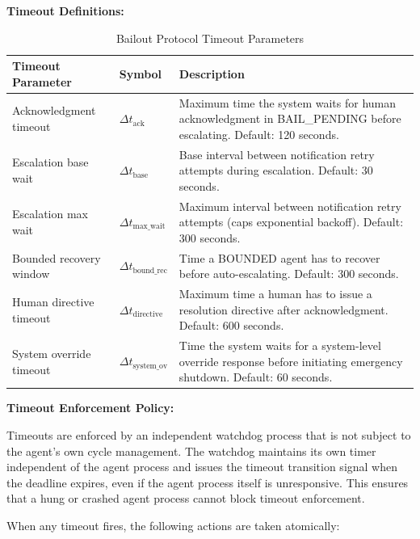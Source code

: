 \medskip\noindent\textbf{Timeout Definitions:}

\begin{table}[H]
\centering
\begin{tabular}{llp{6cm}}
\toprule
\textbf{Timeout Parameter} & \textbf{Symbol} & \textbf{Description} \\
\midrule
Acknowledgment timeout & $\Delta t_{\text{ack}}$ & Maximum time the system waits for human acknowledgment in BAIL\_PENDING before escalating. Default: 120 seconds. \\
Escalation base wait & $\Delta t_{\text{base}}$ & Base interval between notification retry attempts during escalation. Default: 30 seconds. \\
Escalation max wait & $\Delta t_{\text{max\_wait}}$ & Maximum interval between notification retry attempts (caps exponential backoff). Default: 300 seconds. \\
Bounded recovery window & $\Delta t_{\text{bound\_rec}}$ & Time a BOUNDED agent has to recover before auto-escalating. Default: 300 seconds. \\
Human directive timeout & $\Delta t_{\text{directive}}$ & Maximum time a human has to issue a resolution directive after acknowledgment. Default: 600 seconds. \\
System override timeout & $\Delta t_{\text{system\_ov}}$ & Time the system waits for a system-level override response before initiating emergency shutdown. Default: 60 seconds. \\
\bottomrule
\end{tabular}
\caption{Bailout Protocol Timeout Parameters}
\label{tab:timeouts}
\end{table}

\medskip\noindent\textbf{Timeout Enforcement Policy:}

Timeouts are enforced by an independent watchdog process that is not subject to the agent's own cycle management. The watchdog maintains its own timer independent of the agent process and issues the timeout transition signal when the deadline expires, even if the agent process itself is unresponsive. This ensures that a hung or crashed agent process cannot block timeout enforcement.

When any timeout fires, the following actions are taken atomically:

